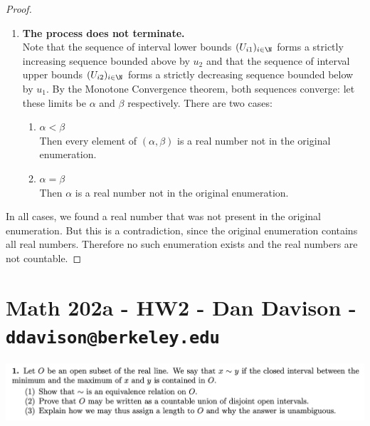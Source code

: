 \begin{proof}
\begin{enumerate}
  \item {\bf The process does not terminate.}\\
    Note that the sequence of interval lower bounds $(U_{i1})_{i\in\N}$ forms a strictly increasing sequence
    bounded above by $u_2$ and that the sequence of interval upper bounds $(U_{i2})_{i\in\N}$ forms a strictly
    decreasing sequence bounded below by $u_1$. By the Monotone Convergence theorem, both sequences converge:
    let these limits be $\alpha$ and $\beta$ respectively. There are two cases:
    \begin{enumerate}
    \item {\bf $\alpha < \beta$}\\
      Then every element of $(\alpha, \beta)$ is a real number not in the original enumeration.
    \item {\bf $\alpha = \beta$}\\
      Then $\alpha$ is a real number not in the original enumeration.
    \end{enumerate}
  \end{enumerate}

  In all cases, we found a real number that was not present in the original enumeration. But this is a
  contradiction, since the original enumeration contains all real numbers. Therefore no such enumeration exists
  and the real numbers are not countable.
\end{proof}

\section*{Math 202a - HW2 - Dan Davison - \texttt{ddavison@berkeley.edu}}


\begin{mdframed}
  \includegraphics[width=400pt]{img/analysis--berkeley-202a-ebe4.png}
\end{mdframed}

